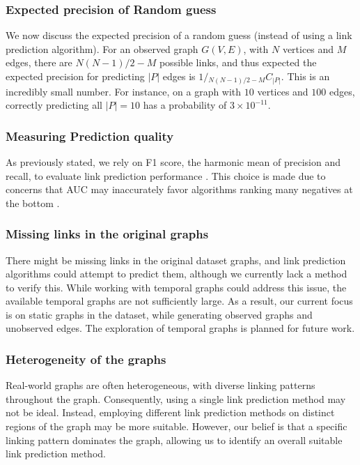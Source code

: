 \subsubsection{Expected precision of Random guess}

We now discuss the expected precision of a random guess (instead of using a link prediction algorithm). For an observed graph $G(V, E)$, with $N$ vertices and $M$ edges, there are $N(N-1)/2 - M$ possible links, and thus expected the expected precision for predicting $|P|$ edges is $1 / {}_{{N(N-1)/2 - M}} C_{|P|}$. This is an incredibly small number. For instance, on a graph with $10$ vertices and $100$ edges, correctly predicting all $|P| = 10$ has a probability of $3\times10^{-11}$.


\subsubsection{Measuring Prediction quality}

As previously stated, we rely on F1 score, the harmonic mean of precision and recall, to evaluate link prediction performance \cite{lu2015toward}. This choice is made due to concerns that AUC may inaccurately favor algorithms ranking many negatives at the bottom \cite{zhou2021progresses, yang2015evaluating, lichtnwalter2012link}.


\subsubsection{Missing links in the original graphs}

There might be missing links in the original dataset graphs, and link prediction algorithms could attempt to predict them, although we currently lack a method to verify this. While working with temporal graphs could address this issue, the available temporal graphs are not sufficiently large. As a result, our current focus is on static graphs in the dataset, while generating observed graphs and unobserved edges. The exploration of temporal graphs is planned for future work.


\subsubsection{Heterogeneity of the graphs}

Real-world graphs are often heterogeneous, with diverse linking patterns throughout the graph. Consequently, using a single link prediction method may not be ideal. Instead, employing different link prediction methods on distinct regions of the graph may be more suitable. However, our belief is that a specific linking pattern dominates the graph, allowing us to identify an overall suitable link prediction method.




